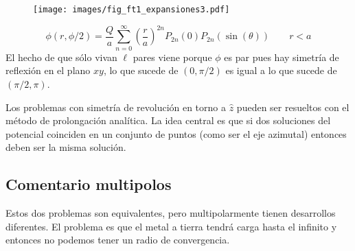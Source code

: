 \documentclass[10pt,oneside]{CBFT_book}
\begin{document}
\begin{figure}[htb]
	\begin{center}
	\texttt{[image: images/fig\_ft1\_expansiones3.pdf]}	 
	\end{center}
	\caption{}
\end{figure} 

\[
	\phi(r,\phi/2) = \frac{Q}{a} \sum_{n=0}^\infty \left( \frac{r}{a}\right)^{2n} P_{2n} (0) P_{2n} 
	(\sin(\theta)) \qquad r < a
\]
El hecho de que sólo vivan $\ell$ pares viene porque $\phi$ es par pues hay simetría de reflexión en el
plano $xy$, lo que sucede de $(0,\pi/2)$ es igual a lo que sucede de $(\pi/2, \pi)$.

Los problemas con simetría de revolución en torno a $\hat{z}$ pueden ser resueltos con el método de
prolongación analítica. La idea central es que si dos soluciones del potencial coinciden en un conjunto
de puntos (como ser el eje azimutal) entonces deben ser la misma solución.

\subsection{Comentario multipolos}

Estos dos problemas son equivalentes, pero multipolarmente tienen desarrollos diferentes.
El problema es que el metal a tierra tendrá carga hasta el infinito y entonces no podemos tener un
radio de convergencia.
\end{document}
